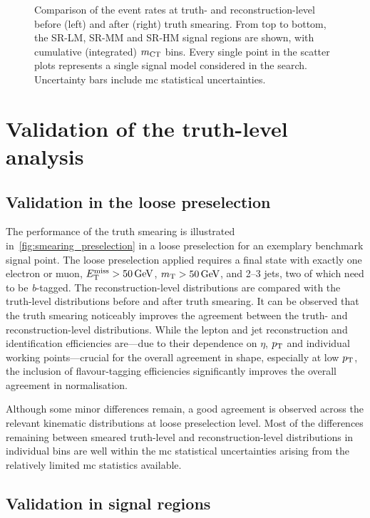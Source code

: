 \begin{figure}
\begin{subfigure}[b]{0.49\linewidth}
	\end{subfigure}
	\caption{Comparison of the event rates at truth- and reconstruction-level before (left) and after (right) truth smearing. From top to bottom, the SR-LM, SR-MM and SR-HM signal regions are shown, with cumulative (integrated) $m_{\textrm{CT}}$ bins. Every single point in the scatter plots represents a single signal model considered in the \onelepton search. Uncertainty bars include \gls{mc} statistical uncertainties.}
	\label{fig:smearing_signal_regions}
\end{figure} 
 
\section{Validation of the truth-level analysis}

\subsection{Validation in the loose preselection}

 The performance of the truth smearing is illustrated in~\cref{fig:smearing_preselection} in a loose preselection for an exemplary benchmark signal point.
 The loose preselection applied requires a final state with exactly one electron or muon, $\met>\SI{50}{\GeV}$, $\mt > \SI{50}{\GeV}$, and 2--3 jets, two of which need to be \textit{b}-tagged.
 The reconstruction-level distributions are compared with the truth-level distributions before and after truth smearing. It can be observed that the truth smearing noticeably improves the agreement between the truth- and reconstruction-level distributions.
 While the lepton and jet reconstruction and identification efficiencies are---due to their dependence on $\eta$, $p_{\mathrm{T}}$ and individual working points---crucial for the overall agreement in shape, especially at low $p_{\mathrm{T}}$, the inclusion of flavour-tagging efficiencies significantly improves the overall agreement in normalisation.
 
Although some minor differences remain, a good agreement is observed across the relevant kinematic distributions at loose preselection level.
Most of the differences remaining between smeared truth-level and reconstruction-level distributions in individual bins are well within the \gls{mc} statistical uncertainties arising from the relatively limited \gls{mc} statistics available.

 
 \subsection{Validation in signal regions}
 
